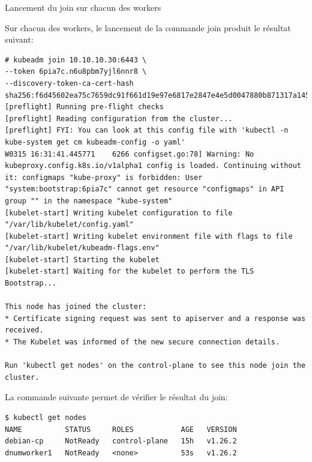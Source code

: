 \begin{frame}[fragile]{Lancement du join sur chacun des workers}

Sur chacun des workers, le lancement de la commande join produit le résultat suivant:
\begin{tiny}
\begin{Verbatim}[commandchars=\&\@\@]
# kubeadm join 10.10.10.30:6443 \
--token 6pia7c.n6u8pbm7yjl6nnr8 \
--discovery-token-ca-cert-hash sha256:f6d45602ea75c7659dc91f661d19e97e6817e2847e4e5d0047880b871317a145
[preflight] Running pre-flight checks
[preflight] Reading configuration from the cluster...
[preflight] FYI: You can look at this config file with 'kubectl -n kube-system get cm kubeadm-config -o yaml'
W0315 16:31:41.445771    6266 configset.go:78] Warning: No kubeproxy.config.k8s.io/v1alpha1 config is loaded. Continuing without it: configmaps "kube-proxy" is forbidden: User "system:bootstrap:6pia7c" cannot get resource "configmaps" in API group "" in the namespace "kube-system"
[kubelet-start] Writing kubelet configuration to file "/var/lib/kubelet/config.yaml"
[kubelet-start] Writing kubelet environment file with flags to file "/var/lib/kubelet/kubeadm-flags.env"
[kubelet-start] Starting the kubelet
[kubelet-start] Waiting for the kubelet to perform the TLS Bootstrap...

This node has joined the cluster:
* Certificate signing request was sent to apiserver and a response was received.
* The Kubelet was informed of the new secure connection details.

Run 'kubectl get nodes' on the control-plane to see this node join the cluster.
\end{Verbatim}
\end{tiny}

La commande suivante permet de vérifier le résultat du join:
\begin{tiny}
\begin{Verbatim}[commandchars=\&\@\@]
$ kubectl get nodes
NAME          STATUS     ROLES           AGE   VERSION
debian-cp     NotReady   control-plane   15h   v1.26.2
dnumworker1   NotReady   <none>          53s   v1.26.2

\end{Verbatim}
\end{tiny}

\end{frame}


